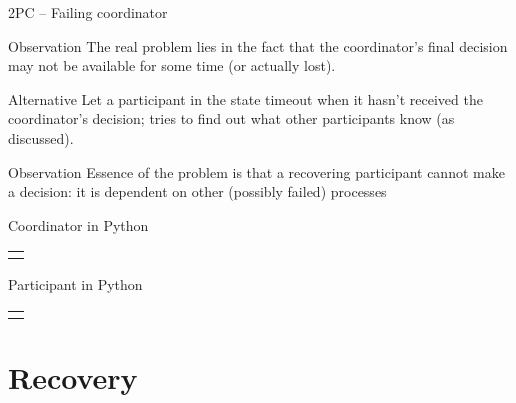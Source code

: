 \begin{slide}{2PC -- Failing coordinator}
  \begin{block}{Observation} 
    The real problem lies in the fact that the coordinator's final decision may not be available for some time
    (or actually lost).
  \end{block}
  \begin{block}{Alternative} 
    Let a participant  in the  state timeout when it hasn't received the coordinator's
    decision;  tries to find out what other participants know (as discussed).
  \end{block}
  \begin{block}{Observation} 
    Essence of the problem is that a recovering participant cannot make a  decision: it is
    dependent on other (possibly failed) processes
  \end{block}
\end{slide}
  \begin{slide}{Coordinator in Python}
    \begin{tabular}{l}
      \begin{adjustbox}{scale=0.8}
        \begin{minipage}{0.8\linewidth}
          {08-34/coordinator-book}
        \end{minipage}
      \end{adjustbox}
    \end{tabular}
  \end{slide}
  \begin{slide}{Participant in Python}
    \begin{tabular}{l}
      \begin{adjustbox}{scale=0.8}
        \begin{minipage}{0.8\linewidth}
          {08-34/participant-book}
        \end{minipage}
      \end{adjustbox}
    \end{tabular}
  \end{slide}
\section{Recovery}
